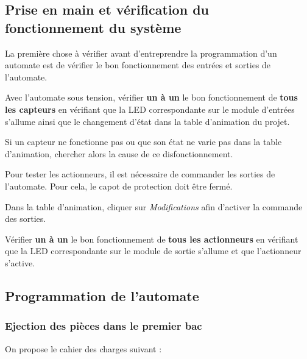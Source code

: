 \documentclass[11pt, multicol]{article}
\begin{document}
\subsection{Prise en main et vérification du fonctionnement du système}
La première chose à vérifier avant d'entreprendre la programmation d'un automate est de vérifier le bon fonctionnement des entrées et sorties de l'automate.
\begin{UPSTIactivite}
	Avec l'automate sous tension, vérifier \textbf{un à un} le bon fonctionnement de \textbf{tous les capteurs} en vérifiant que la LED correspondante sur le module d'entrées s'allume ainsi que le changement d'état dans la table d'animation du projet.

	Si un capteur ne fonctionne pas ou que son état ne varie pas dans la table d'animation, chercher alors la cause de ce disfonctionnement.
\end{UPSTIactivite}

\begin{UPSTIactivite}
Pour tester les actionneurs, il est nécessaire de commander les sorties de l’automate. Pour cela, le capot de protection doit être fermé.

Dans la table d'animation, cliquer sur \textit{Modifications} afin d'activer la commande des sorties.

Vérifier \textbf{un à un} le bon fonctionnement de \textbf{tous les actionneurs} en vérifiant que la LED correspondante sur le module de sortie s'allume et que l'actionneur s'active.
\end{UPSTIactivite}

\subsection{Programmation de l'automate}
\subsubsection{Ejection des pièces dans le premier bac}
On propose le cahier des charges suivant :
\end{document}
